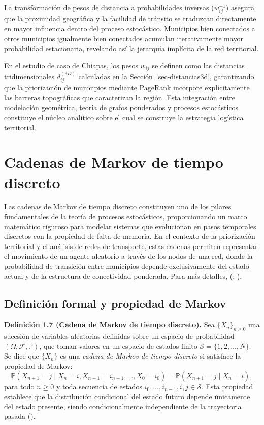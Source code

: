 \documentclass[
  spanish,
  us-letterpaper,
]{scrreprt}
\numberwithin{equation}{section}
\begin{document}
La transformación de pesos de distancia a probabilidades inversas
(\(w_{ij}^{-1}\)) asegura que la proximidad geográfica y la facilidad de
tránsito se traduzcan directamente en mayor influencia dentro del
proceso estocástico. Municipios bien conectados a otros municipios
igualmente bien conectados acumulan iterativamente mayor probabilidad
estacionaria, revelando así la jerarquía implícita de la red
territorial.

En el estudio de caso de Chiapas, los pesos \(w_{ij}\) se definen como
las distancias tridimensionales \(d_{ij}^{(3D)}\) calculadas en la
Sección~\ref{sec-distancias3d}, garantizando que la priorización de
municipios mediante PageRank incorpore explícitamente las barreras
topográficas que caracterizan la región. Esta integración entre
modelación geométrica, teoría de grafos ponderados y procesos
estocásticos constituye el núcleo analítico sobre el cual se construye
la estrategia logística territorial.

\section{Cadenas de Markov de tiempo discreto}\label{sec-markov}

Las cadenas de Markov de tiempo discreto constituyen uno de los pilares
fundamentales de la teoría de procesos estocásticos, proporcionando un
marco matemático riguroso para modelar sistemas que evolucionan en pasos
temporales discretos con la propiedad de falta de memoria. En el
contexto de la priorización territorial y el análisis de redes de
transporte, estas cadenas permiten representar el movimiento de un
agente aleatorio a través de los nodos de una red, donde la probabilidad
de transición entre municipios depende exclusivamente del estado actual
y de la estructura de conectividad ponderada. Para más detalles,
(;
).

\subsection{Definición formal y propiedad de
Markov}\label{definiciuxf3n-formal-y-propiedad-de-markov}

\textbf{Definición 1.7 (Cadena de Markov de tiempo discreto).} Sea
\(\{X_n\}_{n \geq 0}\) una sucesión de variables aleatorias definidas
sobre un espacio de probabilidad \((\Omega, \mathcal{F}, \mathbb{P})\),
que toman valores en un espacio de estados finito
\(\mathcal{S} = \{1, 2, \dots, N\}\). Se dice que \(\{X_n\}\) es una
\emph{cadena de Markov de tiempo discreto} si satisface la propiedad de
Markov: \[
\mathbb{P}(X_{n+1} = j \mid X_n = i, X_{n-1} = i_{n-1}, \dots, X_0 = i_0) = \mathbb{P}(X_{n+1} = j \mid X_n = i),
\] para todo \(n \geq 0\) y toda secuencia de estados
\(i_0, \dots, i_{n-1}, i, j \in \mathcal{S}\). Esta propiedad establece
que la distribución condicional del estado futuro depende únicamente del
estado presente, siendo condicionalmente independiente de la trayectoria
pasada ().
\end{document}
